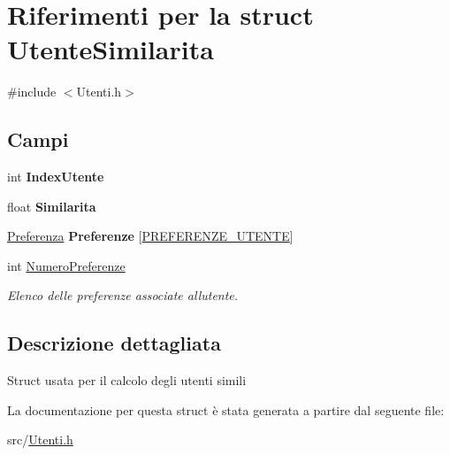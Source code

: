 \hypertarget{struct_utente_similarita}{}\section{Riferimenti per la struct Utente\+Similarita}
\label{struct_utente_similarita}


{\ttfamily \#include $<$Utenti.\+h$>$}

\subsection*{Campi}
\begin{DoxyCompactItemize}
\item 
\mbox{\label{struct_utente_similarita_a85d3886c6ce914e109fcc34baf760ba1}} 
int {\bfseries Index\+Utente}
\item 
\mbox{\label{struct_utente_similarita_ae0b9aa98db295e4785d035af19bc2dd9}} 
float {\bfseries Similarita}
\item 
\mbox{\label{struct_utente_similarita_a1f49823990fca325cd7c75362051eb3b}} 
\hyperlink{struct_preferenza}{Preferenza} {\bfseries Preferenze} \mbox{[}\hyperlink{_utenti_8h_a5220a84a50e74c58eae9c10ee9e2b291}{P\+R\+E\+F\+E\+R\+E\+N\+Z\+E\+\_\+\+U\+T\+E\+N\+TE}\mbox{]}
\item 
\mbox{\label{struct_utente_similarita_abba8ed3d0858f9ecdd1e4e5a71ac3fe7}} 
int \hyperlink{struct_utente_similarita_abba8ed3d0858f9ecdd1e4e5a71ac3fe7}{Numero\+Preferenze}
\begin{DoxyCompactList}\small\item\em Elenco delle preferenze associate all\textquotesingle{}utente. \end{DoxyCompactList}\end{DoxyCompactItemize}


\subsection{Descrizione dettagliata}
Struct usata per il calcolo degli utenti simili 

La documentazione per questa struct è stata generata a partire dal seguente file\+:\begin{DoxyCompactItemize}
\item 
src/\hyperlink{_utenti_8h}{Utenti.\+h}\end{DoxyCompactItemize}
